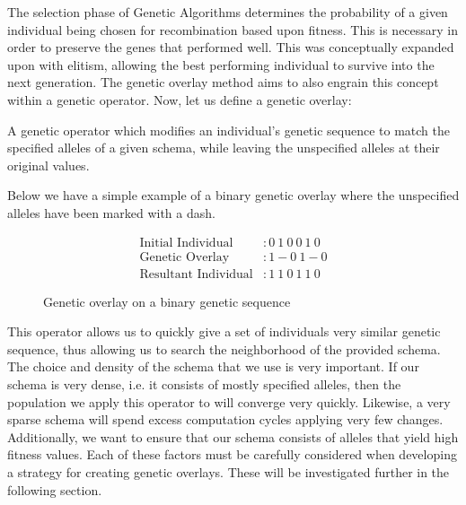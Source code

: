 The selection phase of Genetic Algorithms determines the probability of a given individual being chosen for recombination based upon fitness. This is necessary in order to preserve the genes that performed well. This was conceptually expanded upon with elitism, allowing the best performing individual to survive into the next generation. The genetic overlay method aims to also engrain this concept within a genetic operator. Now, let us define a genetic overlay:

\begin{overlay}
A genetic operator which modifies an individual's genetic sequence to match the specified alleles of a given schema, while leaving the unspecified alleles at their original values. 
\end{overlay}

Below we have a simple example of a binary genetic overlay where the unspecified alleles have been marked with a dash.

\begin{figure}[h!]
\centering 
\begin{align*}
\text{Initial Individual} &: 0~1~0~0~1~0 		\\
\text{Genetic Overlay} &: 1-0~1-0		\\
\text{Resultant Individual} &: 1~1~0~1~1~0			
\end{align*}

\caption{Genetic overlay on a binary genetic sequence}

\end{figure}

This operator allows us to quickly give a set of individuals very similar genetic sequence, thus allowing us to search the neighborhood of the provided schema. The choice and density of the schema that we use is very important. If our schema is very dense, i.e. it consists of mostly specified alleles, then the population we apply this operator to will converge very quickly. Likewise, a very sparse schema will spend excess computation cycles applying very few changes. Additionally, we want to ensure that our schema consists of alleles that yield high fitness values. Each of these factors must be carefully considered when developing a strategy for creating genetic overlays. These will be investigated further in the following section.